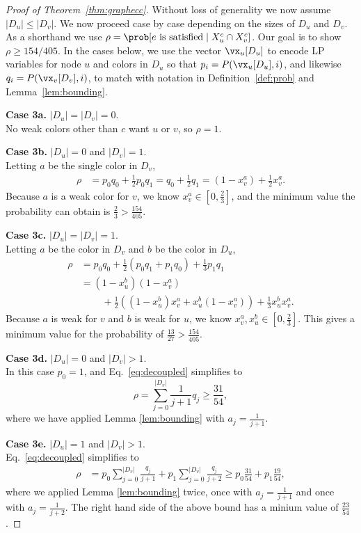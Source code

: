 \begin{proof}[Proof of Theorem~\ref{thm:graphecc}]
	Without loss of generality we now assume $|D_u| \leq |D_v|$. We now proceed case by case depending on the sizes of $D_u$ and $D_v$. As a shorthand we use $\rho = \prob[ e \text{ is satisfied} \mid X_u^c \cap X_v^c ]$. Our goal is to show $\rho \geq 154/405$. In the cases below, we use the vector $\vx_u[D_u]$ to encode LP variables for node $u$ and colors in $D_u$ so that $p_i = P(\vx_u[D_u], i)$, and likewise $q_i = P(\vx_v[D_v], i)$, to match with notation in Definition~\ref{def:prob} and Lemma~\ref{lem:bounding}.
	
	\textbf{Case 3a.} $|D_u| = |D_v| = 0$. \\
	No weak colors other than $c$ want $u$ or $v$, so $\rho = 1$.
	
	\textbf{Case 3b.} $|D_u| = 0$ and $|D_v| = 1$. \\
	Letting $a$ be the single color in $D_v$,
	\begin{align*}
		\rho & = p_0 q_0 + \frac{1}{2} p_0 q_1 = q_0 + \frac{1}{2} q_1 = (1 - x_v^a) + \frac{1}{2} x_v^a.
	\end{align*}
	Because $a$ is a weak color for $v$, we know $x_v^a \in [0, \frac{2}{3}]$, and the minimum value the probability can obtain is $\frac{2}{3} > \frac{154}{405}$.
	
	
	\textbf{Case 3c.} $|D_u| = |D_v| = 1$. \\
	Letting $a$ be the color in $D_v$ and $b$ be the color in $D_u$,
	\begin{align*}
		\rho & = p_0 q_0 + \frac{1}{2}(p_0 q_1 + p_1 q_0) + \frac{1}{3} p_1 q_1 \\
		& = (1 - x_u^b)(1 - x_v^a) \\ & ~~~~~~~~~~+ \frac{1}{2}((1 - x_u^b)x_v^a + x_u^b(1 - x_v^a)) + \frac{1}{3} x_u^b x_v^a.
	\end{align*}
	Because $a$ is weak for $v$ and $b$ is weak for $u$, we know $x_v^a, x_u^b \in [0, \frac{2}{3}]$. This gives a minimum value for the probability of $\frac{13}{27} > \frac{154}{405}$. 
	
	\textbf{Case 3d.} $|D_u| = 0$ and $|D_v| > 1$. \\
	In this case $p_0 = 1$, and Eq.~\eqref{eq:decoupled} simplifies to
	\begin{equation*}
		\rho = \sum_{j = 0}^{|D_v|} \frac{1}{j+1} q_j \geq \frac{31}{54},
	\end{equation*}
	where we have applied Lemma \ref{lem:bounding} with $a_j = \frac{1}{j+1}$.
	
	\textbf{Case 3e.} $|D_u| = 1$ and $|D_v| > 1$. \\
	Eq.~\eqref{eq:decoupled} simplifies to
	\begin{align*}
		\rho &= p_0 \sum_{j = 0}^{|D_v|} \frac{q_j}{j+1}  + p_1 \sum_{j = 0}^{|D_v|} \frac{q_j}{j+2} \geq p_0 \frac{31}{54} + p_1 \frac{19}{54},
	\end{align*}
	where we applied Lemma \ref{lem:bounding} twice, once with $a_j = \frac{1}{j+1}$ and once with $a_j = \frac{1}{j+2}$. The right hand side of the above bound has a minium value of $\frac{23}{54}$.
	

\end{proof}
